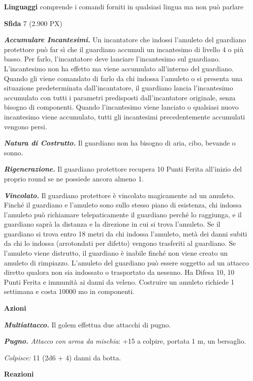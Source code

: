 \begin{multicols}{2}
\textbf{Linguaggi} comprende i comandi forniti in qualsiasi lingua ma non può parlare

\textbf{Sfida} 7 (2.900 PX)

\textit{\textbf{Accumulare Incantesimi.}} Un incantatore che indossi l'amuleto del guardiano protettore può far sì che il guardiano accumuli un incantesimo di livello 4 o più basso. Per farlo, l'incantatore deve lanciare l'incantesimo sul guardiano. L'incantesimo non ha effetto ma viene accumulato all'interno del guardiano. Quando gli viene comandato di farlo da chi indossa l'amuleto o si presenta una situazione predeterminata dall'incantatore, il guardiano lancia l'incantesimo accumulato con tutti i parametri predisposti dall'incantatore originale, senza bisogno di componenti. Quando l'incantesimo viene lanciato o qualsiasi nuovo incantesimo viene accumulato, tutti gli incantesimi precedentemente accumulati vengono persi.

\textit{\textbf{Natura di Costrutto.}} Il guardiano non ha bisogno di aria, cibo, bevande o sonno.

\textit{\textbf{Rigenerazione.}} Il guardiano protettore recupera 10 Punti Ferita all'inizio del proprio round se ne possiede ancora almeno 1.

\textit{\textbf{Vincolato.}} Il guardiano protettore è vincolato magicamente ad un amuleto. Finché il guardiano e l'amuleto sono sullo stesso piano di esistenza, chi indossa l'amuleto può richiamare telepaticamente il guardiano perché lo raggiunga, e il guardiano saprà la distanza e la direzione in cui si trova l'amuleto. Se il guardiano si trova entro 18 metri da chi indossa l'amuleto, metà dei danni subiti da chi lo indossa (arrotondati per difetto) vengono trasferiti al guardiano. Se l'amuleto viene distrutto, il guardiano è inabile finché non viene creato un amuleto di rimpiazzo. L'amuleto del guardiano può essere soggetto ad un attacco diretto qualora non sia indossato o trasportato da nessuno. Ha Difesa 10, 10 Punti Ferita e immunità ai danni da veleno. Costruire un amuleto richiede 1 settimana e costa 10000 mo in componenti.

\textbf{Azioni}

\textit{\textbf{Multiattacco.}} Il golem effettua due attacchi di pugno.

\textit{\textbf{Pugno.} Attacco con arma da mischia}: +15 a colpire, portata 1 m, un bersaglio.

\textit{Colpisce:} 11 (2d6 + 4) danni da botta.

\textbf{Reazioni}


\end{multicols}
